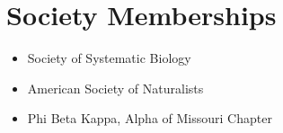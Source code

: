 \documentclass[12pt]{article}
\begin{document}
\section{Society Memberships}
\begin{itemize}
    \item Society of Systematic Biology
    \item American Society of Naturalists
    \item Phi Beta Kappa, Alpha of Missouri Chapter 
\end{itemize}


\end{document}
